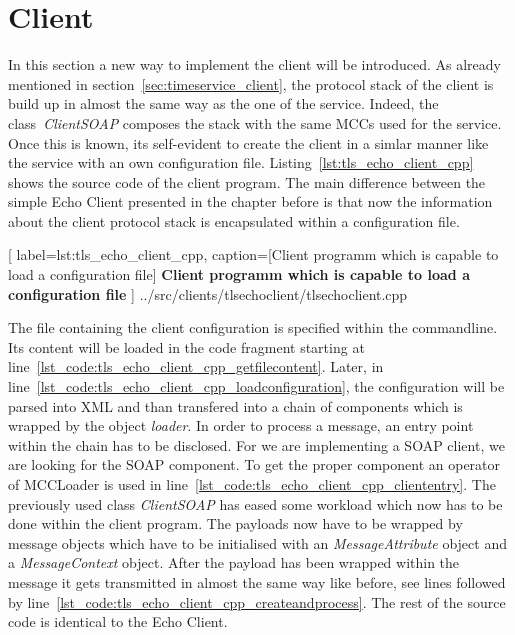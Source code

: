 \clearpage
\section{Client}

In this section a new way to implement the client will be introduced. As already mentioned in section~\ref{sec:timeservice_client}, the protocol stack of the client is build up in almost the same way as the one of the service. Indeed, the class~\textit{ClientSOAP} composes the stack with the same MCCs used for the service. Once this is known, its self-evident to create the client in a simlar manner like the service with an own configuration file.
Listing~\ref{lst:tls_echo_client_cpp} shows the source code of the client program. The main difference between the simple Echo Client presented in the chapter before is that now the information about the client protocol stack is encapsulated within a configuration file.\\

	[
	label=lst:tls_echo_client_cpp,
	caption={[Client programm which is capable to load a configuration file]
	\textbf{Client programm which is capable to load a configuration file}}
	]
{../src/clients/tlsechoclient/tlsechoclient.cpp}


The file containing the client configuration is specified within the commandline. 
Its content will be loaded in the code fragment starting at line~\ref{lst_code:tls_echo_client_cpp_getfilecontent}. 
Later, in line~\ref{lst_code:tls_echo_client_cpp_loadconfiguration}, the configuration will be parsed into XML and than transfered into a chain of components which is wrapped by the object \textit{loader}. In order to process a message, an entry point within the chain has to be disclosed. For we are implementing a SOAP client, we are looking for the SOAP component. 
To get the proper component an operator of MCCLoader is used in line~\ref{lst_code:tls_echo_client_cpp_cliententry}.
The previously used class \textit{ClientSOAP} has eased some workload which now has to be done within the client program.
The payloads now have to be wrapped by message objects which have to be initialised with an \textit{MessageAttribute} object and a \textit{MessageContext} object. After the payload has been wrapped within the message it gets transmitted in almost the same way like before, see lines followed by line~\ref{lst_code:tls_echo_client_cpp_createandprocess}. The rest of the source code is identical to the Echo Client.\\





